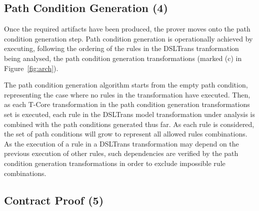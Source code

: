 \subsection{Path Condition Generation (4)}
\label{sec:path_cond_gen}

Once the required artifacts have been produced, the prover moves onto the path
condition generation step. Path condition generation is operationally achieved
by executing, following the ordering of the rules in the DSLTrans
tranformation being analysed, the path condition generation transformations
(marked (c) in Figure~\ref{fig:arch}).

The path condition generation algorithm starts from the empty path condition,
representing the case where no rules in the transformation have executed. Then,
as each T-Core transformation in the path condition generation transformations
set is executed, each rule in the DSLTrans model transformation under analysis
is combined with the path conditions generated thus far. As each rule is
considered, the set of path conditions will grow to represent all allowed
rules combinations. As the execution of a rule in a DSLTrans
transformation may depend on the previous execution of other rules, such
dependencies are verified by the path condition generation
transformations in order to exclude impossible rule combinations.


 
\subsection{Contract Proof (5)}

